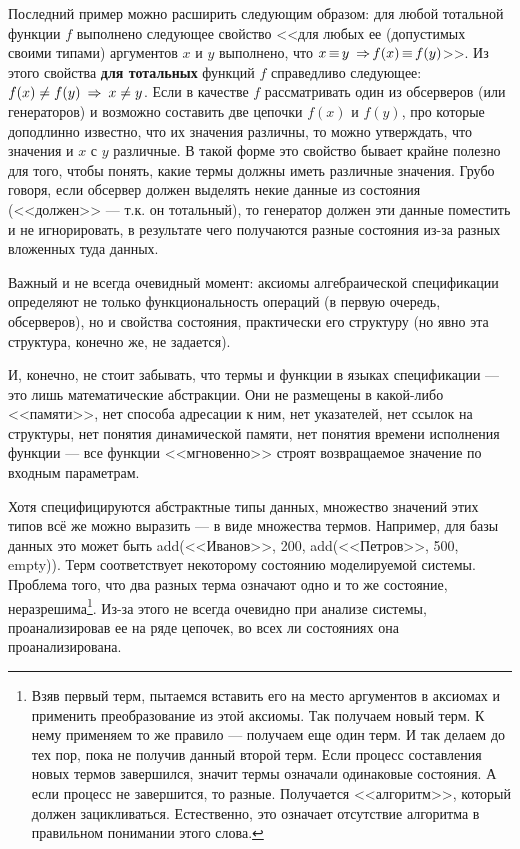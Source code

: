 Последний пример можно расширить следующим образом: для любой тотальной функции $f$ выполнено следующее свойство <<для любых ее (допустимых своими типами) аргументов $x$ и $y$ выполнено, что $x \mathop{\equiv} y ~\mathop{\Rightarrow}~\\ f(x) \mathop{\equiv} f(y)$>>. Из этого свойства \textbf{для тотальных} функций $f$ справедливо следующее: $f(x) \neq f(y) ~\mathop{\Rightarrow}~ x \neq y$. Если в качестве $f$ рассматривать один из обсерверов (или генераторов) и возможно составить две цепочки $f(x)$ и $f(y)$, про которые доподлинно известно, что их значения различны, то можно утверждать, что значения и $x$ с $y$ различные. В такой форме это свойство бывает крайне полезно для того, чтобы понять, какие термы должны иметь различные значения. Грубо говоря, если обсервер должен выделять некие данные из состояния (<<должен>> --- т.к. он тотальный), то генератор должен эти данные поместить и не игнорировать, в результате чего получаются разные состояния из-за разных вложенных туда данных.

Важный и не всегда очевидный момент: аксиомы алгебраической спецификации определяют не только функциональность операций (в первую очередь, обсерверов), но и свойства состояния, практически его структуру (но явно эта структура, конечно же, не задается).

И, конечно, не стоит забывать, что термы и функции в языках спецификации --- это лишь математические абстракции. Они не размещены в какой-либо <<памяти>>, нет способа адресации к ним, нет указателей, нет ссылок на структуры, нет понятия динамической памяти, нет понятия времени исполнения функции --- все функции <<мгновенно>> строят возвращаемое значение по входным параметрам.


Хотя специфицируются абстрактные типы данных, множество значений этих типов всё же можно выразить --- в виде множества термов. Например, для базы данных это может быть add(<<Иванов>>, 200, add(<<Петров>>, 500, empty)). Терм соответствует некоторому состоянию моделируемой системы. Проблема того, что два разных терма означают одно и то же состояние, неразрешима\footnote{Взяв первый терм, пытаемся вставить его на место аргументов в аксиомах и применить преобразование из этой аксиомы. Так получаем новый терм. К нему применяем то же правило --- получаем еще один терм. И так делаем до тех пор, пока не получив данный второй терм. Если процесс составления новых термов завершился, значит термы означали одинаковые состояния. А если процесс не завершится, то разные. Получается <<алгоритм>>, который должен зацикливаться. Естественно, это означает отсутствие алгоритма в правильном понимании этого слова.}. Из-за этого не всегда очевидно при анализе системы, проанализировав ее на ряде цепочек, во всех ли состояниях она проанализирована.

